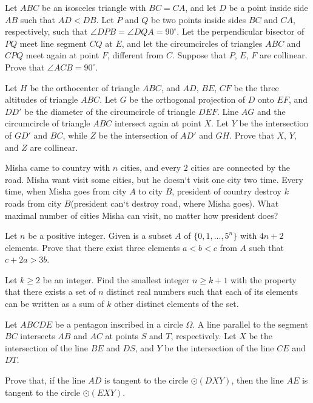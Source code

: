 \documentclass[11pt]{scrartcl}
\begin{document}
\begin{problem}[6302540840099076878]
Let $ABC$ be an isosceles triangle with $BC=CA$, and let $D$ be a point inside side $AB$ such that $AD< DB$. Let $P$ and $Q$ be two points inside sides $BC$ and $CA$, respectively, such that $\angle DPB = \angle DQA = 90^{\circ}$. Let the perpendicular bisector of $PQ$ meet line segment $CQ$ at $E$, and let the circumcircles of triangles $ABC$ and $CPQ$ meet again at point $F$, different from $C$.
Suppose that $P$, $E$, $F$ are collinear. Prove that $\angle ACB = 90^{\circ}$.
\end{problem}
\begin{problem}[1872712387771032593]
Let $H$ be the orthocenter of triangle $ABC$, and $AD$, $BE$, $CF$ be the three altitudes of triangle $ABC$. Let $G$ be the orthogonal projection of $D$ onto $EF$, and $DD'$ be the diameter of the circumcircle of triangle $DEF$. Line $AG$ and the circumcircle of triangle $ABC$ intersect again at point $X$. Let $Y$ be the intersection of $GD'$ and $BC$, while $Z$ be the intersection of $AD'$ and $GH$. Prove that $X$, $Y$, and $Z$ are collinear.
\end{problem}
\begin{problem}[308215997593136]
Misha came to country with $n$ cities, and every $2$ cities are connected by the road. Misha want visit some cities, but he doesn`t visit one city two time. Every time, when Misha goes from city $A$ to city $B$, president of country destroy $k$ roads from city $B$(president can`t destroy road, where Misha goes). What maximal number of cities Misha can visit, no matter how president does?
\end{problem}
\begin{problem}[80567267310692]
Let $n$ be a positive integer. Given is a subset $A$ of $\{0,1,...,5^n\}$ with $4n+2$ elements. Prove that there exist three elements $a<b<c$ from $A$ such that $c+2a>3b$.
\end{problem}
\begin{problem}[1837105952530316058]
Let $k\ge2$ be an integer. Find the smallest integer $n \ge k+1$ with the property that there exists a set of $n$ distinct real numbers such that each of its elements can be written as a sum of $k$ other distinct elements of the set.
\end{problem}
\begin{problem}[5867489266334805897]
	Let $ABCDE$ be a pentagon inscribed in a circle $\Omega$. A line parallel to the segment $BC$ intersects $AB$ and $AC$ at points $S$ and $T$, respectively. Let $X$ be the intersection of the line $BE$ and $DS$, and $Y$ be the intersection of the line $CE$ and $DT$.

Prove that, if the line $AD$ is tangent to the circle $\odot(DXY)$, then the line $AE$ is tangent to the circle $\odot(EXY)$.
\end{problem}
\end{document}
